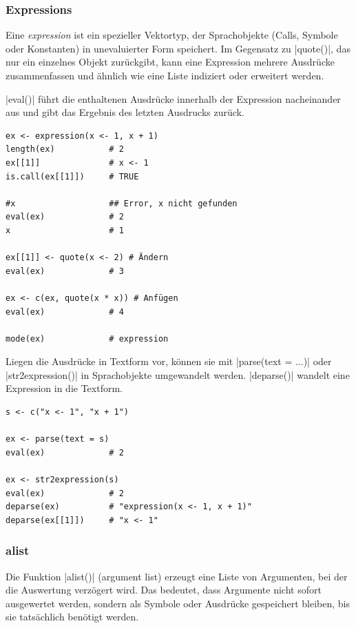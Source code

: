 \documentclass[10pt,twocolumn]{scrartcl}
\renewcommand{\lstinline}{\mycoloredinline}
\begin{document}
\subsubsection{Expressions}

Eine \emph{expression} ist ein spezieller Vektortyp, der Sprachobjekte (Calls, Symbole oder Konstanten) in unevaluierter Form speichert. Im Gegensatz zu \lstinline|quote()|, das nur ein einzelnes Objekt zurückgibt, kann eine Expression mehrere Ausdrücke zusammenfassen und ähnlich wie eine Liste indiziert oder erweitert werden.

\lstinline|eval()| führt die enthaltenen Ausdrücke innerhalb der Expression nacheinander aus und gibt das Ergebnis des letzten Ausdrucks zurück.

\begin{lstlisting}
ex <- expression(x <- 1, x + 1)
length(ex)           # 2
ex[[1]]              # x <- 1
is.call(ex[[1]])     # TRUE

#x                   ## Error, x nicht gefunden
eval(ex)             # 2
x                    # 1

ex[[1]] <- quote(x <- 2) # Ändern
eval(ex)             # 3

ex <- c(ex, quote(x * x)) # Anfügen
eval(ex)             # 4

mode(ex)             # expression
\end{lstlisting}

Liegen die Ausdrücke in Textform vor, können sie mit \lstinline|parse(text = ...)| oder \lstinline|str2expression()| in Sprachobjekte umgewandelt werden.
\lstinline|deparse()| wandelt eine Expression in die Textform.

\begin{lstlisting}
s <- c("x <- 1", "x + 1")

ex <- parse(text = s)
eval(ex)             # 2

ex <- str2expression(s)
eval(ex)             # 2
deparse(ex)          # "expression(x <- 1, x + 1)"
deparse(ex[[1]])     # "x <- 1"
\end{lstlisting}


\subsubsection{alist}

Die Funktion \lstinline|alist()| (argument list) erzeugt eine Liste von Argumenten, bei der die Auswertung verzögert wird. Das bedeutet, dass Argumente nicht sofort ausgewertet werden, sondern als Symbole oder Ausdrücke gespeichert bleiben, bis sie tatsächlich benötigt werden.
\end{document}
